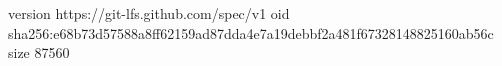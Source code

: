 version https://git-lfs.github.com/spec/v1
oid sha256:e68b73d57588a8ff62159ad87dda4e7a19debbf2a481f67328148825160ab56c
size 87560
